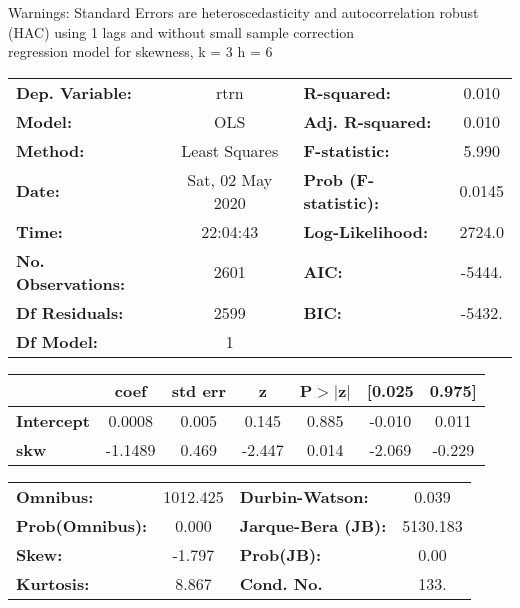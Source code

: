 Warnings: \newline
 [1] Standard Errors are heteroscedasticity and autocorrelation robust (HAC) using 1 lags and without small sample correction\\ 

regression model for skewness, k = 3 h = 6\begin{center}
\begin{tabular}{lclc}
\toprule
\textbf{Dep. Variable:}    &       rtrn       & \textbf{  R-squared:         } &     0.010   \\
\textbf{Model:}            &       OLS        & \textbf{  Adj. R-squared:    } &     0.010   \\
\textbf{Method:}           &  Least Squares   & \textbf{  F-statistic:       } &     5.990   \\
\textbf{Date:}             & Sat, 02 May 2020 & \textbf{  Prob (F-statistic):} &   0.0145    \\
\textbf{Time:}             &     22:04:43     & \textbf{  Log-Likelihood:    } &    2724.0   \\
\textbf{No. Observations:} &        2601      & \textbf{  AIC:               } &    -5444.   \\
\textbf{Df Residuals:}     &        2599      & \textbf{  BIC:               } &    -5432.   \\
\textbf{Df Model:}         &           1      & \textbf{                     } &             \\
\bottomrule
\end{tabular}
\begin{tabular}{lcccccc}
                   & \textbf{coef} & \textbf{std err} & \textbf{z} & \textbf{P$> |$z$|$} & \textbf{[0.025} & \textbf{0.975]}  \\
\midrule
\textbf{Intercept} &       0.0008  &        0.005     &     0.145  &         0.885        &       -0.010    &        0.011     \\
\textbf{skw}       &      -1.1489  &        0.469     &    -2.447  &         0.014        &       -2.069    &       -0.229     \\
\bottomrule
\end{tabular}
\begin{tabular}{lclc}
\textbf{Omnibus:}       & 1012.425 & \textbf{  Durbin-Watson:     } &    0.039  \\
\textbf{Prob(Omnibus):} &   0.000  & \textbf{  Jarque-Bera (JB):  } & 5130.183  \\
\textbf{Skew:}          &  -1.797  & \textbf{  Prob(JB):          } &     0.00  \\
\textbf{Kurtosis:}      &   8.867  & \textbf{  Cond. No.          } &     133.  \\
\bottomrule
\end{tabular}
\end{center}

